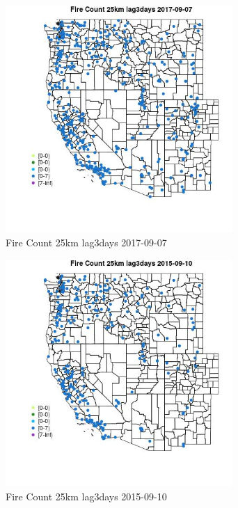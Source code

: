 \begin{figure} 
\centering  
\includegraphics[width=0.77\textwidth]{Code_Outputs/Report_ML_input_PM25_Step4_part_e_de_duplicated_aves_compiled_2019-05-21wNAs_MapObsFire_Count_25km_lag3days2017-09-07.jpg} 
\caption{\label{fig:Report_ML_input_PM25_Step4_part_e_de_duplicated_aves_compiled_2019-05-21wNAsMapObsFire_Count_25km_lag3days2017-09-07}Fire Count 25km lag3days 2017-09-07} 
\end{figure} 
 

\clearpage 

\begin{figure} 
\centering  
\includegraphics[width=0.77\textwidth]{Code_Outputs/Report_ML_input_PM25_Step4_part_e_de_duplicated_aves_compiled_2019-05-21wNAs_MapObsFire_Count_25km_lag3days2015-09-10.jpg} 
\caption{\label{fig:Report_ML_input_PM25_Step4_part_e_de_duplicated_aves_compiled_2019-05-21wNAsMapObsFire_Count_25km_lag3days2015-09-10}Fire Count 25km lag3days 2015-09-10} 
\end{figure} 
 

